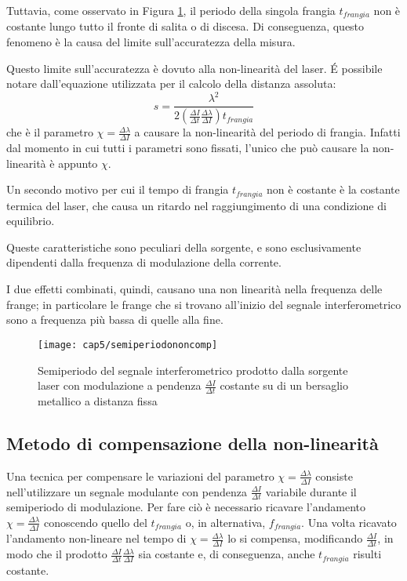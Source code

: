 Tuttavia, come osservato in Figura \ref{semiperiodononcomp}, il periodo della singola frangia $t_{frangia}$ non è costante lungo tutto il fronte di salita o di discesa. Di conseguenza, questo fenomeno è la causa del limite sull'accuratezza della misura.

Questo limite sull'accuratezza è dovuto alla non-linearità del laser. \'E possibile notare dall'equazione utilizzata per il calcolo della distanza assoluta: 
\begin{equation}
	s = \frac{\lambda^2}{2\left ( \frac{\Delta I}{\Delta t} \frac{\Delta \lambda}{\Delta I} \right ) t_{frangia}} 
\end{equation}
che è il parametro $\chi = \frac{\Delta \lambda}{\Delta I}$ a causare la non-linearità del periodo di frangia. Infatti dal momento in cui tutti i parametri sono fissati, l'unico che può causare la non-linearità è appunto $\chi$.

Un secondo motivo per cui il tempo di frangia $t_{frangia}$ non è costante è la costante termica del laser, che causa un ritardo nel raggiungimento di una condizione di equilibrio.

Queste caratteristiche sono peculiari della sorgente, e sono esclusivamente dipendenti dalla frequenza di modulazione della corrente.	

I due effetti combinati, quindi, causano una non linearità nella frequenza delle frange; in particolare le frange che si trovano all'inizio del segnale interferometrico sono a frequenza più bassa di quelle alla fine.
\begin{figure}[H]
	\begin{center}
		\texttt{[image: cap5/semiperiodononcomp]}
		\caption{Semiperiodo del segnale interferometrico prodotto dalla sorgente laser con modulazione a pendenza $\frac{\Delta I}{\Delta t}$ costante su di un bersaglio metallico a distanza fissa}
		\label{semiperiodononcomp}
	\end{center}
\end{figure}

\subsection{Metodo di compensazione della non-linearità}
\label{subsec:metodocomp}
Una tecnica per compensare le variazioni del parametro $\chi = \frac{\Delta \lambda}{\Delta I}$ consiste nell'utilizzare un segnale modulante con pendenza $\frac{\Delta I}{\Delta t}$ variabile durante il semiperiodo di modulazione. Per fare ciò è necessario ricavare l'andamento $\chi = \frac{\Delta \lambda}{\Delta I}$ conoscendo quello del $t_{frangia}$ o, in alternativa, $f_{frangia}$. Una volta ricavato l'andamento non-lineare nel tempo di $\chi = \frac{\Delta \lambda}{\Delta I}$ lo si compensa, modificando $\frac{\Delta I}{\Delta t}$, in modo che il prodotto $\frac{\Delta I}{\Delta t} \frac{\Delta \lambda}{\Delta I}$ sia costante e, di conseguenza, anche $t_{frangia}$ risulti costante.

